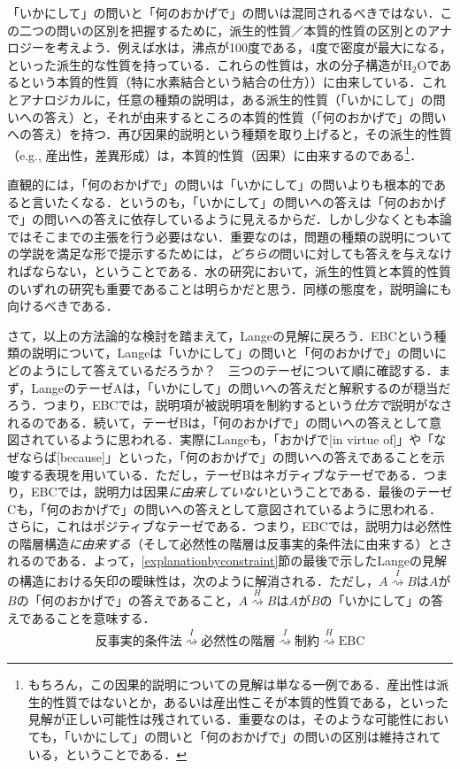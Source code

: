 \documentclass[dvipdfmx,twoside,11pt,uplatex]{jsarticle}
\theoremstyle{definition}
\begin{document}
「いかにして」の問いと「何のおかげで」の問いは混同されるべきではない．この二つの問いの区別を把握するために，派生的性質／本質的性質の区別とのアナロジーを考えよう．例えば水は，沸点が100度である，4度で密度が最大になる，といった派生的な性質を持っている．これらの性質は，水の分子構造が$\text{H}_2\text{O}$であるという本質的性質（特に水素結合という結合の仕方））に由来している．これとアナロジカルに，任意の種類の説明は，ある派生的性質（「いかにして」の問いへの答え）と，それが由来するところの本質的性質（「何のおかげで」の問いへの答え）を持つ．再び因果的説明という種類を取り上げると，その派生的性質（e.g., 産出性，差異形成）は，本質的性質（因果）に由来するのである\footnote{
もちろん，この因果的説明についての見解は単なる一例である．産出性は派生的性質ではないとか，あるいは産出性こそが本質的性質である，といった見解が正しい可能性は残されている．重要なのは，そのような可能性においても，「いかにして」の問いと「何のおかげで」の問いの区別は維持されている，ということである．
}．

直観的には，「何のおかげで」の問いは「いかにして」の問いよりも根本的であると言いたくなる．というのも，「いかにして」の問いへの答えは「何のおかげで」の問いへの答えに依存しているように見えるからだ．しかし少なくとも本論ではそこまでの主張を行う必要はない．重要なのは，問題の種類の説明についての学説を満足な形で提示するためには，\emph{どちらの}問いに対しても答えを与えなければならない，ということである．水の研究において，派生的性質と本質的性質のいずれの研究も重要であることは明らかだと思う．同様の態度を，説明論にも向けるべきである．

さて，以上の方法論的な検討を踏まえて，Langeの見解に戻ろう．EBCという種類の説明について，Langeは「いかにして」の問いと「何のおかげで」の問いにどのようにして答えているだろうか？　三つのテーゼについて順に確認する．まず，LangeのテーゼAは，「いかにして」の問いへの答えだと解釈するのが穏当だろう．つまり，EBCでは，説明項が被説明項を制約するという\emph{仕方で}説明がなされるのである．続いて，テーゼBは，「何のおかげで」の問いへの答えとして意図されているように思われる．実際にLangeも，「おかげで[in virtue of]」や「なぜならば[because]」といった，「何のおかげで」の問いへの答えであることを示唆する表現を用いている．ただし，テーゼBはネガティブなテーゼである．つまり，EBCでは，説明力は因果\emph{に由来していない}ということである．最後のテーゼCも，「何のおかげで」の問いへの答えとして意図されているように思われる．さらに，これはポジティブなテーゼである．つまり，EBCでは，説明力は必然性の階層構造\emph{に由来する}（そして必然性の階層は反事実的条件法に由来する）とされるのである．よって，\ref{explanationbyconstraint}節の最後で示したLangeの見解の構造における矢印の曖昧性は，次のように解消される．ただし，$A\overset{I}{\rightsquigarrow}B$は$A$が$B$の「何のおかげで」の答えであること，$A\overset{H}{\rightsquigarrow}B$は$A$が$B$の「いかにして」の答えであることを意味する．
\begin{align*}
    反事実的条件法 \overset{I}{\rightsquigarrow} 必然性の階層 \overset{I}{\rightsquigarrow} 制約 \overset{H}{\rightsquigarrow} \text{EBC}
\end{align*}
\end{document}

